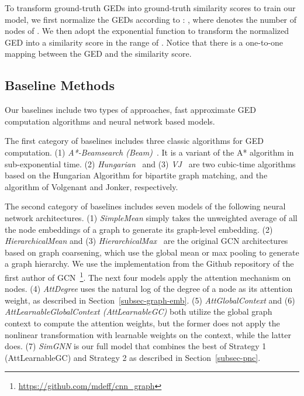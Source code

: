 \documentclass[sigconf]{acmart}
\begin{document}
To transform ground-truth GEDs into ground-truth similarity scores to train our model, we first normalize the GEDs according to \cite{qureshi2007graph}: , where  denotes the number of nodes of .
We then adopt the exponential function  to transform the normalized GED into a similarity score in the range of . Notice that there is a one-to-one mapping between the GED and the similarity score.

\subsection{Baseline Methods}
\label{subsec-baselines}

Our baselines include two types of approaches, fast approximate GED computation algorithms and neural network based models. 

The first category of baselines includes three classic algorithms for GED computation. (1) \textit{A*-Beamsearch (Beam)}~\cite{neuhaus2006fast}. It is a variant of the A* algorithm in sub-exponential time. (2) \textit{Hungarian}~\cite{kuhn1955hungarian,riesen2009approximate} and (3) \textit{VJ}~\cite{jonker1987shortest,fankhauser2011speeding} are two cubic-time algorithms based on the Hungarian Algorithm for bipartite graph matching, and the algorithm of Volgenant and Jonker, respectively.

The second category of baselines includes seven models of the following neural network architectures. (1) \textit{SimpleMean} simply takes the unweighted average of all the node embeddings of a graph to generate its graph-level embedding. (2) \textit{HierarchicalMean} and (3) \textit{HierarchicalMax}~\cite{defferrard2016convolutional} are the original GCN architectures based on graph coarsening, which use the global mean or max pooling to generate a graph hierarchy. We use the implementation from the Github repository of the first author of GCN~\footnote{\url{https://github.com/mdeff/cnn_graph}}. The next four models apply the attention mechanism on nodes. (4) \textit{AttDegree} uses the natural log of the degree of a node as its attention weight, as described in Section~\ref{subsec-graph-emb}. (5) \textit{AttGlobalContext} and (6) \textit{AttLearnableGlobalContext (AttLearnableGC)} both utilize the global graph context to compute the attention weights, but the former does not apply the nonlinear transformation with learnable weights on the context, while the latter does. (7) \textit{SimGNN} is our full model that combines the best of Strategy 1 (AttLearnableGC) and Strategy 2 as described in Section~\ref{subsec-pnc}.
\end{document}
